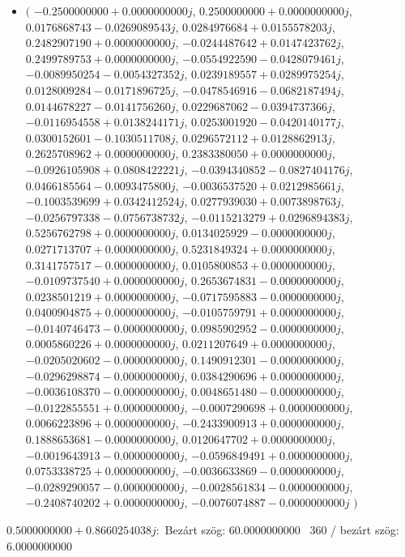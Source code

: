 \documentclass[14pt,a4paper]{article}
\begin{document}
\begin{itemize}
\item
$\big($
$-0.2500000000+0.0000000000j$, $0.2500000000+0.0000000000j$, $0.0176868743-0.0269089543j$, $0.0284976684+0.0155578203j$, $0.2482907190+0.0000000000j$, $-0.0244487642+0.0147423762j$, $0.2499789753+0.0000000000j$, $-0.0554922590-0.0428079461j$, $-0.0089950254-0.0054327352j$, $0.0239189557+0.0289975254j$, $0.0128009284-0.0171896725j$, $-0.0478546916-0.0682187494j$, $0.0144678227-0.0141756260j$, $0.0229687062-0.0394737366j$, $-0.0116954558+0.0138244171j$, $0.0253001920-0.0420140177j$, $0.0300152601-0.1030511708j$, $0.0296572112+0.0128862913j$, $0.2625708962+0.0000000000j$, $0.2383380050+0.0000000000j$, $-0.0926105908+0.0808422221j$, $-0.0394340852-0.0827404176j$, $0.0466185564-0.0093475800j$, $-0.0036537520+0.0212985661j$, $-0.1003539699+0.0342412524j$, $0.0277939030+0.0073898763j$, $-0.0256797338-0.0756738732j$, $-0.0115213279+0.0296894383j$, $0.5256762798+0.0000000000j$, $0.0134025929-0.0000000000j$, $0.0271713707+0.0000000000j$, $0.5231849324+0.0000000000j$, $0.3141757517-0.0000000000j$, $0.0105800853+0.0000000000j$, $-0.0109737540+0.0000000000j$, $0.2653674831-0.0000000000j$, $0.0238501219+0.0000000000j$, $-0.0717595883-0.0000000000j$, $0.0400904875+0.0000000000j$, $-0.0105759791+0.0000000000j$, $-0.0140746473-0.0000000000j$, $0.0985902952-0.0000000000j$, $0.0005860226+0.0000000000j$, $0.0211207649+0.0000000000j$, $-0.0205020602-0.0000000000j$, $0.1490912301-0.0000000000j$, $-0.0296298874-0.0000000000j$, $0.0384290696+0.0000000000j$, $-0.0036108370-0.0000000000j$, $0.0048651480-0.0000000000j$, $-0.0122855551+0.0000000000j$, $-0.0007290698+0.0000000000j$, $0.0066223896+0.0000000000j$, $-0.2433900913+0.0000000000j$, $0.1888653681-0.0000000000j$, $0.0120647702+0.0000000000j$, $-0.0019643913-0.0000000000j$, $-0.0596849491+0.0000000000j$, $0.0753338725+0.0000000000j$, $-0.0036633869-0.0000000000j$, $-0.0289290057-0.0000000000j$, $-0.0028561834-0.0000000000j$, $-0.2408740202+0.0000000000j$, $-0.0076074887-0.0000000000j$
$\big)$
\end{itemize}
$0.5000000000+0.8660254038j$:\
Bezárt szög: $60.0000000000$ \
360 / bezárt szög: $6.0000000000$\
\end{document}
